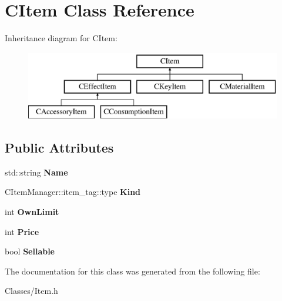 \hypertarget{class_c_item}{}\section{C\+Item Class Reference}
\label{class_c_item}
Inheritance diagram for C\+Item\+:\begin{figure}[H]
\begin{center}
\leavevmode
\includegraphics[height=3.000000cm]{class_c_item}
\end{center}
\end{figure}
\subsection*{Public Attributes}
\begin{DoxyCompactItemize}
\item 
std\+::string {\bfseries Name}\hypertarget{class_c_item_a1c72d0cdd2a18da3e8e80c7afdde828e}{}\label{class_c_item_a1c72d0cdd2a18da3e8e80c7afdde828e}

\item 
C\+Item\+Manager\+::item\+\_\+tag\+::type {\bfseries Kind}\hypertarget{class_c_item_afd15631a39190613aa14fdcc07a11d88}{}\label{class_c_item_afd15631a39190613aa14fdcc07a11d88}

\item 
int {\bfseries Own\+Limit}\hypertarget{class_c_item_a7d9cf16617730fac1065d0b33a329f09}{}\label{class_c_item_a7d9cf16617730fac1065d0b33a329f09}

\item 
int {\bfseries Price}\hypertarget{class_c_item_a48ac81e7d59d2f66ceb87f236791f98e}{}\label{class_c_item_a48ac81e7d59d2f66ceb87f236791f98e}

\item 
bool {\bfseries Sellable}\hypertarget{class_c_item_afb8ee5b88e34725d782ede5202d4c135}{}\label{class_c_item_afb8ee5b88e34725d782ede5202d4c135}

\end{DoxyCompactItemize}


The documentation for this class was generated from the following file\+:\begin{DoxyCompactItemize}
\item 
Classes/Item.\+h\end{DoxyCompactItemize}
